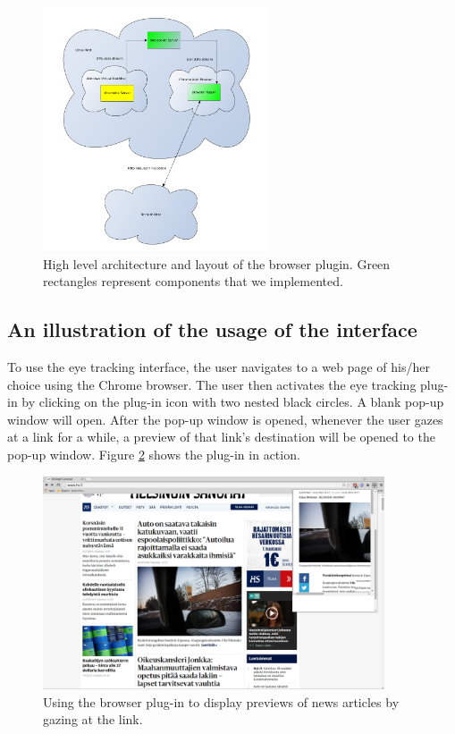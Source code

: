 \documentclass[english]{tktltiki}
\begin{document}
\begin{figure}[h]
\begin{center}
\includegraphics[width=0.6\textwidth]{plugin_architecture.png}
\caption{High level architecture and layout of the browser plugin. Green rectangles represent components that we implemented.}
\label{pluginarchitecture}
\end{center}
\end{figure}

\subsection{An illustration of the usage of the interface}

To use the eye tracking interface, the user navigates to a web page of his/her choice using the Chrome browser. The user then activates the eye tracking plug-in by clicking on the plug-in icon with two nested black circles. A blank pop-up window will open. After the pop-up window is opened, whenever the user gazes at a link for a while, a preview of that link's destination will be opened to the pop-up window. Figure \ref{pluginusage} shows the plug-in in action.

\begin{figure}[h]
\begin{center}
\includegraphics[width=0.9\textwidth]{browser_plugin.png}
\caption{Using the browser plug-in to display previews of news articles by gazing at the link.}
\label{pluginusage}
\end{center}
\end{figure}
\end{document}
